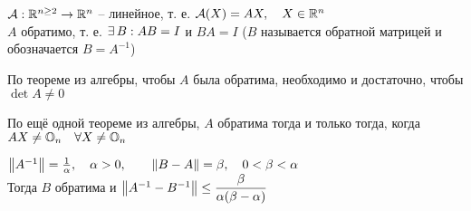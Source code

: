 \begin{theorem}
	$ \mathcal{A} : \mathbb{R}^{n \ge 2} \to \mathbb{R}^n $ -- линейное, т. е. $ \mathcal{A}(X) = AX, \quad X \in \mathbb{R}^n $ \\
	$ A $ обратимо, т. е. $ \exists\, B : AB = I $ и $ BA = I $ ($ B $ называется обратной матрицей и обозначается $ B = A^{-1} $)
	\begin{remind}
		По теореме из алгебры, чтобы $ A $ была обратима, необходимо и достаточно, чтобы $ \det A \ne 0 $
	\end{remind}
	\begin{remind}
		По ещё одной теореме из алгебры, $ A $ обратима тогда и только тогда, когда $ AX \ne \mathbb{O}_{n} \quad \forall X \ne \mathbb{O}_{n} $
	\end{remind}
	$ \left\|{A^{-1}}\right\| = \frac1\alpha, \quad \alpha > 0, \qquad \left\|{B - A}\right\| = \beta, \quad 0 < \beta < \alpha $ \\
	Тогда $ B $ обратима и $ \left\|{A^{-1} - B^{-1}}\right\| \le \dfrac{\beta}{\alpha(\beta - \alpha)} $
\end{theorem}

